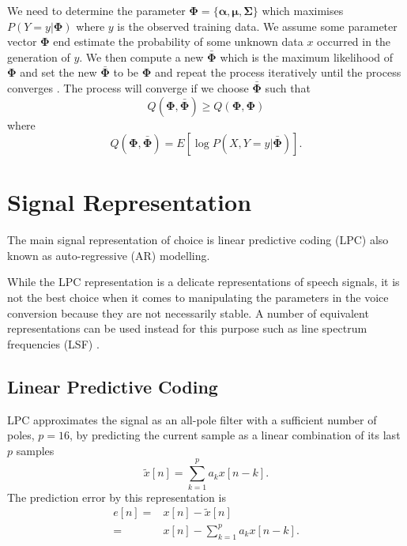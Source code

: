 We need to determine the parameter $\mathbf{\Phi} = \{\boldsymbol{\alpha}, \boldsymbol{\mu}, \mathbf{\Sigma}\}$ which maximises $P(Y=y\vert \mathbf{\Phi})$ where $y$ is the observed training data. We assume some parameter vector $\mathbf{\Phi}$ end estimate the probability of some unknown data $x$ occurred in the generation of $y$. We then compute a new $\bar{\mathbf{\Phi}}$ which is the maximum likelihood of $\mathbf{\Phi}$ and set the new $\bar{\mathbf{\Phi}}$ to be $\mathbf{\Phi}$ and repeat the process iteratively until the process converges \cite{taletek}. The process will converge if we choose $\bar{\mathbf{\Phi}}$ such that 
\begin{equation}
	\label{eq:q_criteria}
	Q(\mathbf{\Phi},\bar{\mathbf{\Phi}})\geq Q(\mathbf{\Phi},\mathbf{\Phi})
\end{equation}
where 
\begin{equation}
	\label{eq:q_function}
	Q(\mathbf{\Phi},\bar{\mathbf{\Phi}}) = E[\log P(X,Y=y\vert \bar{\mathbf{\Phi}})].
\end{equation}

\section{Signal Representation} %
\label{sec:signal_representation}
The main signal representation of choice is linear predictive coding (LPC) also known as auto-regressive (AR) modelling. 

While the LPC representation is a delicate representations of speech signals, it is not the best choice when it comes to manipulating the parameters in the voice conversion because they are not necessarily stable. A number of equivalent representations can be used instead for this purpose such as line spectrum frequencies (LSF) \cite{taletek}.

\subsection{Linear Predictive Coding} %
\label{sub:lpc}
LPC approximates the signal as an all-pole filter with a sufficient number of poles, \eg $p=16$, by predicting the current sample as a linear combination of its last $p$ samples \cite{digsig}
\begin{equation}
	\tilde{x}[n] = \sum_{k=1}^{p}a_k x[n-k].
\end{equation}
The prediction error by this representation is 
\begin{equation}
	\begin{split}
		e[n]= & x[n]-\tilde{x}[n]\\
		= & x[n]-\sum_{k=1}^{p}a_k x[n-k].
	\end{split}
\end{equation}

